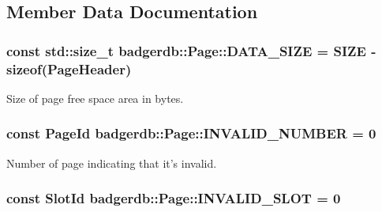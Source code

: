 \subsection{Member Data Documentation}
\hypertarget{classbadgerdb_1_1Page_a74057ec71412352ef0aa5913bbebed25}{
\subsubsection[{D\-A\-T\-A\-\_\-\-S\-I\-Z\-E}]{\setlength{\rightskip}{0pt plus 5cm}const std\-::size\-\_\-t badgerdb\-::\-Page\-::\-D\-A\-T\-A\-\_\-\-S\-I\-Z\-E = {\bf S\-I\-Z\-E} -\/ sizeof({\bf Page\-Header})\hspace{0.3cm}{\ttfamily [static]}}}\label{classbadgerdb_1_1Page_a74057ec71412352ef0aa5913bbebed25}
Size of page free space area in bytes. \hypertarget{classbadgerdb_1_1Page_a785a1e756d47fb7f8f3603a3fe8ffcef}{
\subsubsection[{I\-N\-V\-A\-L\-I\-D\-\_\-\-N\-U\-M\-B\-E\-R}]{\setlength{\rightskip}{0pt plus 5cm}const {\bf Page\-Id} badgerdb\-::\-Page\-::\-I\-N\-V\-A\-L\-I\-D\-\_\-\-N\-U\-M\-B\-E\-R = 0\hspace{0.3cm}{\ttfamily [static]}}}\label{classbadgerdb_1_1Page_a785a1e756d47fb7f8f3603a3fe8ffcef}
Number of page indicating that it's invalid. \hypertarget{classbadgerdb_1_1Page_a4013fab43df72bc52931241575736353}{
\subsubsection[{I\-N\-V\-A\-L\-I\-D\-\_\-\-S\-L\-O\-T}]{\setlength{\rightskip}{0pt plus 5cm}const {\bf Slot\-Id} badgerdb\-::\-Page\-::\-I\-N\-V\-A\-L\-I\-D\-\_\-\-S\-L\-O\-T = 0\hspace{0.3cm}{\ttfamily [static]}}}\label{classbadgerdb_1_1Page_a4013fab43df72bc52931241575736353}
